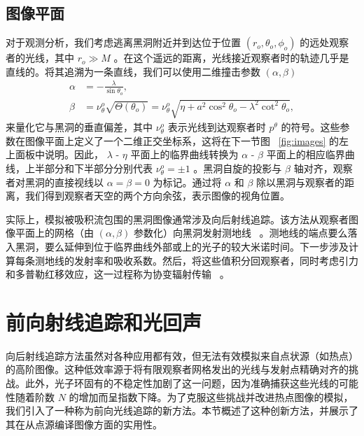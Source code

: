 \documentclass[aps,reprint,superscriptaddress,nofootinbib,floatfix,longbibliography,preprintnumbers]{revtex4-1}
\begin{document}
   \subsection{图像平面  }       \label{subsec:OP}    对于观测分析，我们考虑逃离黑洞附近并到达位于位置    $(r_o, \theta_o, \phi_o)$    的远处观察者的光线，其中    $r_o \gg M$    。在这个遥远的距离，光线接近观察者时的轨迹几乎是直线的。将其追溯为一条直线，我们可以使用二维撞击参数    $(\alpha, \beta)$    ~    \cite{Bardeen:1973tla,Gralla:2017ufe,Gralla:2019drh}    
   \begin{equation}
    \begin{aligned}
    \alpha&=-\frac{\lambda}{\sin\theta_o}, \\ 
    \beta&=\nu_{\theta}^o\sqrt{\Theta(\theta_o)}=\nu_{\theta}^o\sqrt{\eta+a^2\cos^2\theta_o-\lambda^2\cot^2\theta_o},
    \label{eq:impact parameters}
    \end{aligned}
\end{equation}    来量化它与黑洞的垂直偏差，其中    $\nu_{\theta}^o$    表示光线到达观察者时    $p^{\theta}$    的符号。这些参数在图像平面上定义了一个二维正交坐标系，这将在下一节图~    \ref{fig:images}    的左上面板中说明。因此，    $\lambda$    -    $\eta$    平面上的临界曲线转换为    $\alpha$    -    $\beta$    平面上的相应临界曲线，上半部分和下半部分分别代表    $\nu_{\theta}^o = \pm 1$   。黑洞自旋的投影与    $\beta$    轴对齐，观察者对黑洞的直接视线以    $\alpha = \beta = 0$    为标记。通过将    $\alpha$    和    $\beta$    除以黑洞与观察者的距离，我们得到观察者天空的两个方向余弦，表示图像的视角位置。  

实际上，模拟被吸积流包围的黑洞图像通常涉及向后射线追踪。该方法从观察者图像平面上的网格（由    $(\alpha, \beta)$    参数化）向黑洞发射测地线~    \cite{Bardeen:1973tla,Luminet:1979nyg}    。测地线的端点要么落入黑洞，要么延伸到位于临界曲线外部或上的光子的较大米诺时间。下一步涉及计算每条测地线的发射率和吸收系数。然后，将这些值积分回观察者，同时考虑引力和多普勒红移效应，这一过程称为协变辐射传输~    \cite{Gammie_2012, Dexter:2016cdk}    。
   \section{前向射线追踪和光回声  }       \label{sec:FRLE}    向后射线追踪方法虽然对各种应用都有效，但无法有效模拟来自点状源（如热点）的高阶图像。这种低效率源于将有限观察者网格发出的光线与发射点精确对齐的挑战。此外，光子环固有的不稳定性加剧了这一问题，因为准确捕获这些光线的可能性随着阶数    $N$    的增加而呈指数下降。为了克服这些挑战并改进热点图像的模拟，我们引入了一种称为前向光线追踪的新方法。本节概述了这种创新方法，并展示了其在从点源编译图像方面的实用性。
\end{document}
